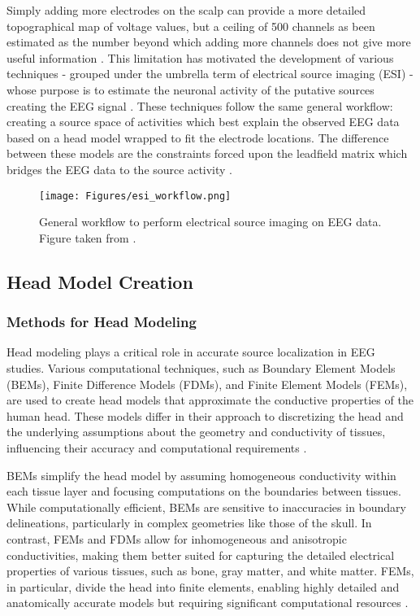 Simply adding more electrodes on the scalp can provide a more detailed topographical map of voltage values, but a ceiling of 500 channels as been estimated as the number beyond which adding more channels does not give more useful information \cite{songEEGSourceLocalization2015}. This limitation has motivated the  development of various techniques - grouped under the umbrella term of electrical source imaging (ESI) - whose purpose is to estimate the neuronal activity of the putative sources creating the EEG signal \cite{bailletElectromagneticBrainMapping2001}.  These techniques follow the same general workflow: creating a source space of activities which best explain the observed EEG data based on a head model wrapped to fit the electrode locations. The difference between these models are the constraints forced upon the leadfield matrix which bridges the EEG data to the source activity \cite{zorzosAdvancesElectricalSource2021}. 

\begin{figure}[H]
\centering
\texttt{[image: Figures/esi\_workflow.png]}
\caption{General workflow to perform electrical source imaging on EEG data. Figure taken from \cite{zorzosAdvancesElectricalSource2021}. \label{fig:esi_basic}}
\end{figure}

\subsection{Head Model Creation}

\subsubsection{Methods for Head Modeling}

Head modeling plays a critical role in accurate source localization in EEG studies. Various computational techniques, such as Boundary Element Models (BEMs), Finite Difference Models (FDMs), and Finite Element Models (FEMs), are used to create head models that approximate the conductive properties of the human head. These models differ in their approach to discretizing the head and the underlying assumptions about the geometry and conductivity of tissues, influencing their accuracy and computational requirements \cite{hallezReviewSolvingForward2007a}.

BEMs simplify the head model by assuming homogeneous conductivity within each tissue layer and focusing computations on the boundaries between tissues. While computationally efficient, BEMs are sensitive to inaccuracies in boundary delineations, particularly in complex geometries like those of the skull. In contrast, FEMs and FDMs allow for inhomogeneous and anisotropic conductivities, making them better suited for capturing the detailed electrical properties of various tissues, such as bone, gray matter, and white matter. FEMs, in particular, divide the head into finite elements, enabling highly detailed and anatomically accurate models but requiring significant computational resources \cite{akalinacarEffectsForwardModel2013}.

